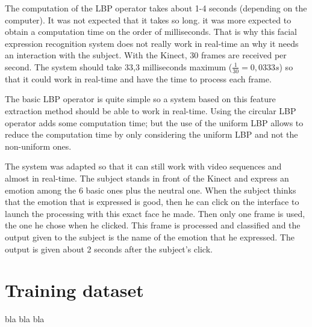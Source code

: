 \vspace{\baselineskip}
\noindent The computation of the LBP operator takes about 1-4 seconds (depending on the computer). It was not expected that it takes so long. it was more expected to obtain a computation time on the order of milliseconds. That is why this facial expression recognition system does not really work in real-time an why it needs an interaction with the subject. With the Kinect, 30 frames are received per second. The system should take 33,3 milliseconds maximum ($ \frac{1}{30} = 0,0333 s $) so that it could work in real-time and have the time to process each frame. 
\newline

\noindent The basic LBP operator is quite simple so a system based on this feature extraction method should be able to work in real-time. Using the circular LBP operator adds some computation time; but the use of the uniform LBP allows to reduce the computation time by only considering the uniform LBP and not the non-uniform ones.
\newline

\noindent The system was adapted so that it can still work with video sequences and almost in real-time. The subject stands in front of the Kinect and express an emotion among the 6 basic ones plus the neutral one. When the subject thinks that the emotion that is expressed is good, then he can click on the interface to launch the processing with this exact face he made. Then only one frame is used, the one he chose when he clicked. This frame is processed and classified and the output given to the subject is the name of the emotion that he expressed. The output is given about 2 seconds after the subject's click.
\newline

\section{Training dataset}

\vspace{\baselineskip}

\noindent bla bla bla
\newline